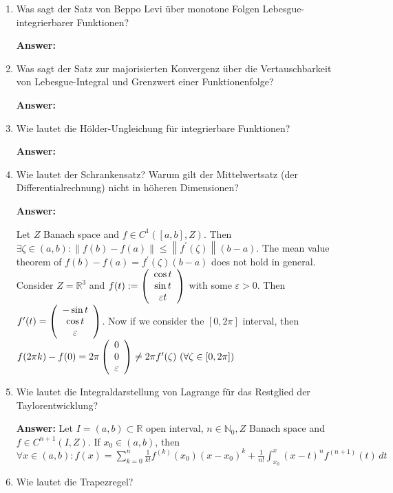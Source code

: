 \documentclass[11pt]{article}
\newcommand{\norm}[1]{\left\lVert#1\right\rVert}
\newcommand{\RR}[0]{\mathbb{R}}
\newcommand{\NN}[0]{\mathbb{N}}
\begin{document}
\begin{enumerate}
    \item Was sagt der Satz von Beppo Levi über monotone Folgen Lebesgue-integrierbarer Funktionen?

    \textbf{Answer:}
    \item Was sagt der Satz zur majorisierten Konvergenz über die Vertauschbarkeit von Lebesgue-Integral und Grenzwert einer Funktionenfolge?

    \textbf{Answer:}
    \item Wie lautet die Hölder-Ungleichung für integrierbare Funktionen?

    \textbf{Answer:}

    \item Wie lautet der Schrankensatz? Warum gilt der Mittelwertsatz (der Differentialrechnung) nicht in höheren Dimensionen?

    \textbf{Answer:}

    Let $Z$ Banach space and $f \in C^1([a, b], Z)$. Then $\exists \zeta \in (a, b)\colon \norm{f(b) - f(a)} \le \norm{f^\prime(\zeta)}(b-a)$.
    The mean value theorem of $f(b) - f(a) = f^\prime(\zeta)(b-a)$ does not hold in general. Consider $Z = \RR^3$ and $f(t) := \left(\begin{array}[]{c}
        \cos{t}\\\sin{t}\\\varepsilon t
    \end{array}\right)$ with some $\varepsilon > 0$. Then $f^\prime(t) =\left(\begin{array}[]{c}
        -\sin{t}\\\cos{t}\\\varepsilon
    \end{array}\right)$. Now if we consider the $[0, 2\pi]$ interval, then $f(2\pi k) - f(0) = 2\pi \left(\begin{array}[]{c}
        0\\0\\\varepsilon
    \end{array}\right) \neq 2\pi f^\prime(\zeta)~(\forall \zeta \in [0, 2\pi])$

    \item Wie lautet die Integraldarstellung von Lagrange für das Restglied der Taylorentwicklung?

    \textbf{Answer:} Let $I = (a, b) \subset \RR$ open interval, $n \in \NN_0, Z$ Banach space and $f \in C^{n+1}(I, Z)$. If $x_0 \in (a, b)$, then $\forall x \in (a, b)\colon f(x) = \sum_{k=0}^n \frac{1}{k!}f^{(k)}(x_0) (x - x_0)^k + \frac{1}{n!} \int_{x_0}^x (x-t)^n f^{(n+1)}(t)\,dt$
    \item Wie lautet die Trapezregel?


\end{enumerate}
\end{document}
